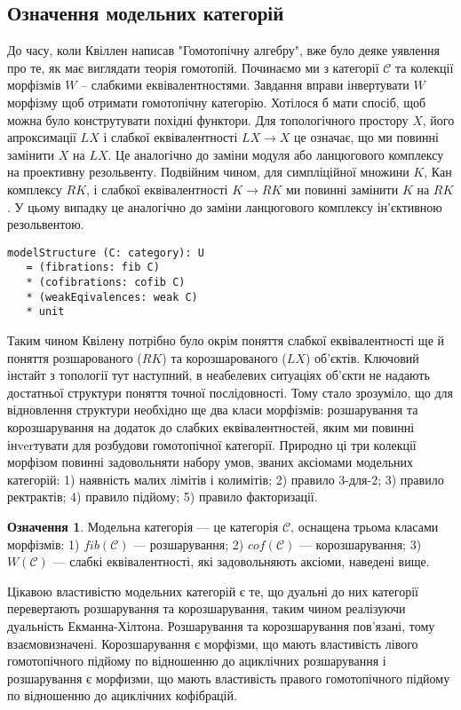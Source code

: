 \documentclass[12pt]{article}
\theoremstyle{plain}
\theoremstyle{definition}
\newtheorem{definition}{Означення}[section]
\theoremstyle{remark}
\begin{document}
\subsection{Означення модельних категорій}
До часу, коли Квіллен написав "Гомотопічну алгебру", вже було деяке уявлення про те,
як має виглядати теорія гомотопій. Починаємо ми з категорії $\mathcal{C}$ та колекції морфізмів $W$ –
слабкими еквівалентностями. Завдання вправи інвертувати $W$ морфізму щоб отримати гомотопічну категорію.
Хотілося б мати спосіб, щоб можна було конструтувати похідні функтори. Для топологічного простору $X$,
його апроксимації $LX$ і слабкої еквівалентності $LX \to X$ це означає, що ми повинні
замінити $X$ на $LX$. Це аналогічно до заміни модуля або ланцюгового комплексу на
проективну резольвенту. Подвійним чином, для симпліційної множини $K$, Кан комплексу $RK$,
і слабкої еквівалентності $K \to RK$ ми повинні замінити $K$ на $RK$. У цьому випадку це
аналогічно до заміни ланцюгового комплексу ін'єктивною резольвентою.

\begin{lstlisting}
modelStructure (C: category): U
   = (fibrations: fib C)
   * (cofibrations: cofib C)
   * (weakEqivalences: weak C)
   * unit
\end{lstlisting}

Таким чином Квілену потрібно було окрім поняття слабкої еквівалентності ще й поняття розшарованого ($RK$) та корозшарованого ($LX$) об'єктів. Ключовий інстайт з топології тут наступний, в неабелевих ситуаціях об'єкти не надають достатньої структури поняття точної послідовності. Тому стало зрозуміло, що для відновлення структури необхідно ще два класи морфізмів: розшарування та корозшарування на додаток до слабких еквівалентностей, яким ми повинні інverтувати для розбудови гомотопічної категорії. Природно ці три колекції морфізом повинні задовольняти набору умов, званих аксіомами модельних категорій: 1) наявність малих лімітів і колимітів; 2) правило 3-для-2; 3) правило ректрактів; 4) правило підйому; 5) правило факторизації.

\begin{definition}
Модельна категорія --- це категорія $\mathcal{C}$, оснащена трьома класами морфізмів: 1) $fib(\mathcal{C})$ --- розшарування; 2) $cof(\mathcal{C})$ --- корозшарування; 3) $W(\mathcal{C})$ --- слабкі еквівалентності, які задовольняють аксіоми, наведені вище.
\end{definition}

Цікавою властивістю модельних категорій є те, що дуальні до них категорії перевертають розшарування та корозшарування, таким чином реалізуючи дуальність Екманна-Хілтона. Розшарування та корозшарування пов'язані, тому взаємовизначені. Корозшарування є морфізми, що мають властивість лівого гомотопічного підйому по відношенню до ациклічних розшарування і розшарування є морфизми, що мають властивість правого гомотопічного підйому по відношенню до ациклічних кофібрацій.
\end{document}
